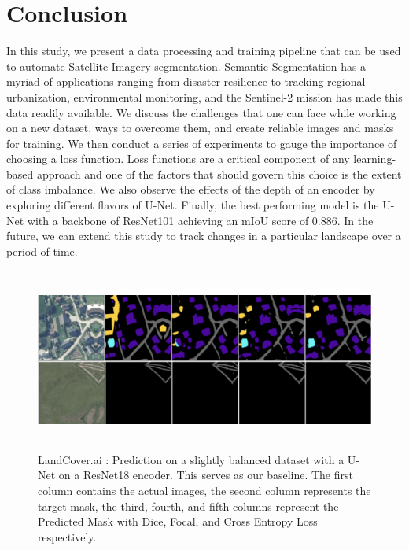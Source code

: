 \documentclass[conference]{IEEEtran}
\begin{document}
\section{Conclusion}

In this study, we present a data processing and training pipeline that can be used to automate Satellite Imagery segmentation. Semantic Segmentation has a myriad of applications ranging from disaster resilience to tracking regional urbanization, environmental monitoring, and the Sentinel-2 mission has made this data readily available. We discuss the challenges that one can face while working on a new dataset, ways to overcome them, and create reliable images and masks for training. We then conduct a series of experiments to gauge the importance of choosing a loss function. Loss functions are a critical component of any learning-based approach and one of the factors that should govern this choice is the extent of class imbalance. We also observe the effects of the depth of an encoder by exploring different flavors of U-Net. Finally, the best performing model is the U-Net with a backbone of ResNet101 achieving an mIoU score of 0.886. In the future, we can extend this study to track changes in a particular landscape over a period of time.

\begin{figure}
    \centering
    \includegraphics[height=6cm]{images/roads-losses/roads-smaller.png}
    \caption{LandCover.ai : Prediction on a slightly balanced dataset with a U-Net on a ResNet18 encoder. This serves as our baseline. The first column contains the actual images, the second column represents the target mask, the third, fourth, and fifth columns represent the Predicted Mask with Dice, Focal, and Cross Entropy Loss respectively.}
\end{figure}
\end{document}
